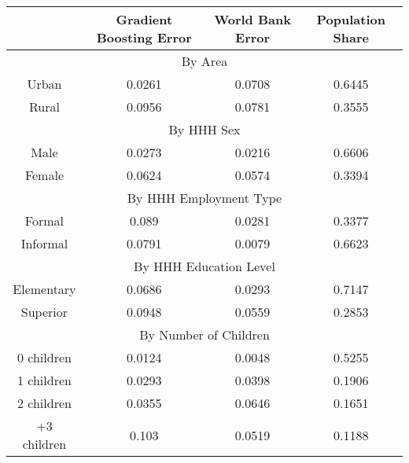 \begin{table}[]
\begin{tabular}{@{}cccc@{}}
\toprule
            & Gradient Boosting Error & World Bank Error & Population Share \\ \midrule
\multicolumn{4}{c}{By Area}                                                 \\ \midrule
Urban       & 0.0261                  & 0.0708           & 0.6445           \\
Rural       & 0.0956                  & 0.0781           & 0.3555           \\ \midrule
\multicolumn{4}{c}{By HHH Sex}                                              \\ \midrule
Male        & 0.0273                  & 0.0216           & 0.6606           \\
Female      & 0.0624                  & 0.0574           & 0.3394           \\ \midrule
\multicolumn{4}{c}{By HHH Employment Type}                                  \\ \midrule
Formal      & 0.089                   & 0.0281           & 0.3377           \\
Informal    & 0.0791                  & 0.0079           & 0.6623           \\ \midrule
\multicolumn{4}{c}{By HHH Education Level}                                  \\ \midrule
Elementary  & 0.0686                  & 0.0293           & 0.7147           \\
Superior    & 0.0948                  & 0.0559           & 0.2853           \\ \midrule
\multicolumn{4}{c}{By Number of Children}                                   \\ \midrule
0 children  & 0.0124                  & 0.0048           & 0.5255           \\
1 children  & 0.0293                  & 0.0398           & 0.1906           \\
2 children  & 0.0355                  & 0.0646           & 0.1651           \\
+3 children & 0.103                   & 0.0519           & 0.1188          
\end{tabular}
\end{table}